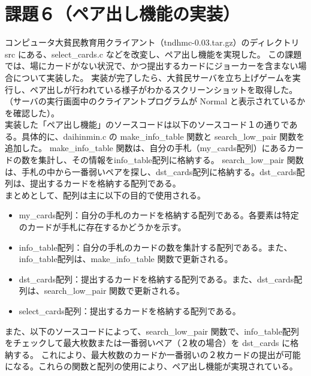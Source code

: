 \documentclass[]{jsarticle}
\begin{document}
\section*{課題６（ペア出し機能の実装）}
コンピュータ大貧民教育用クライアント（tndhmc-0.03.tar.gz）のディレクトリ src にある、select\_cards.c などを改変し、ペア出し機能を実現した。
この課題では、場にカードがない状況で、かつ提出するカードにジョーカーを含まない場合について実装した。
実装が完了したら、大貧民サーバを立ち上げゲームを実行し、ペア出しが行われている様子がわかるスクリーンショットを取得した。
（サーバの実行画面中のクライアントプログラムが Normal と表示されているかを確認した）。\\

実装した「ペア出し機能」のソースコードは以下のソースコード１の通りである。具体的に、daihinmin.c の make\_info\_table 関数と search\_low\_pair 関数を追加した。
make\_info\_table 関数は、自分の手札（my\_cards配列）にあるカードの数を集計し、その情報をinfo\_table配列に格納する。
search\_low\_pair 関数は、手札の中から一番弱いペアを探し、dst\_cards配列に格納する。dst\_cards配列は、提出するカードを格納する配列である。\\

まとめとして、配列は主に以下の目的で使用される。
\begin{itemize}
  \item my\_cards配列：自分の手札のカードを格納する配列である。各要素は特定のカードが手札に存在するかどうかを示す。
  \item info\_table配列：自分の手札のカードの数を集計する配列である。また、info\_table配列は、make\_info\_table 関数で更新される。
  \item dst\_cards配列：提出するカードを格納する配列である。また、dst\_cards配列は、search\_low\_pair 関数で更新される。
  \item select\_cards配列：提出するカードを格納する配列である。
\end{itemize}

また、以下のソースコードによって、search\_low\_pair 関数で、info\_table配列をチェックして最大枚数または一番弱いペア（２枚の場合）を dst\_cards に格納する。
これにより、最大枚数のカードか一番弱いの２枚カードの提出が可能になる。これらの関数と配列の使用により、ペア出し機能が実現されている。
\end{document}
